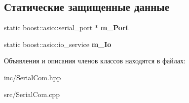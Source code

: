 \subsection*{Статические защищенные данные}
\begin{DoxyCompactItemize}
\item 
\mbox{\label{classSerialCom_af9c471aeac11c13e3b90ac9cf71389b0}} 
static boost\+::asio\+::serial\+\_\+port $\ast$ {\bfseries m\+\_\+\+Port}
\item 
\mbox{\label{classSerialCom_a52fa53905af7d17e3216274e8dc9cb7e}} 
static boost\+::asio\+::io\+\_\+service {\bfseries m\+\_\+\+Io}
\end{DoxyCompactItemize}


Объявления и описания членов классов находятся в файлах\+:\begin{DoxyCompactItemize}
\item 
inc/Serial\+Com.\+hpp\item 
src/Serial\+Com.\+cpp\end{DoxyCompactItemize}

